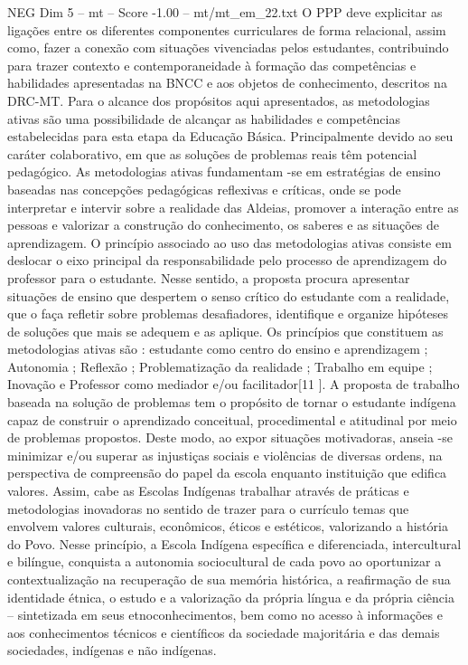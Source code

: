 \begin{textsample}{NEG Dim 5 – mt – Score -1.00 – mt/mt\_em\_22.txt}
O PPP deve explicitar as ligações entre os diferentes componentes curriculares de forma relacional, assim como, fazer a conexão com situações vivenciadas pelos estudantes, contribuindo para trazer contexto e contemporaneidade à formação das competências e habilidades apresentadas na BNCC e aos objetos de conhecimento, descritos na DRC-MT.
Para o alcance dos propósitos aqui apresentados, as metodologias ativas são uma possibilidade de alcançar as habilidades e competências estabelecidas para esta etapa da Educação Básica.
Principalmente devido ao seu caráter colaborativo, em que as soluções de problemas reais têm potencial pedagógico.
As metodologias ativas fundamentam -se em estratégias de ensino baseadas nas concepções pedagógicas reflexivas e críticas, onde se pode interpretar e intervir sobre a realidade das Aldeias, promover a interação entre as pessoas e valorizar a construção do conhecimento, os saberes e as situações de aprendizagem.
O princípio associado ao uso das metodologias ativas consiste em deslocar o eixo principal da responsabilidade pelo processo de aprendizagem do professor para o estudante.
Nesse sentido, a proposta procura apresentar situações de ensino que despertem o senso crítico do estudante com a realidade, que o faça refletir sobre problemas desafiadores, identifique e organize hipóteses de soluções que mais se adequem e as aplique.
Os princípios que constituem as metodologias ativas são : estudante como centro do ensino e aprendizagem ; Autonomia ; Reflexão ; Problematização da realidade ; Trabalho em equipe ; Inovação e Professor como mediador e/ou facilitador[11 ].
A proposta de trabalho baseada na solução de problemas tem o propósito de tornar o estudante indígena capaz de construir o aprendizado conceitual, procedimental e atitudinal por meio de problemas propostos.
Deste modo, ao expor situações motivadoras, anseia -se minimizar e/ou superar as injustiças sociais e violências de diversas ordens, na perspectiva de compreensão do papel da escola enquanto instituição que edifica valores.
Assim, cabe as Escolas Indígenas trabalhar através de práticas e metodologias inovadoras no sentido de trazer para o currículo temas que envolvem valores culturais, econômicos, éticos e estéticos, valorizando a história do Povo.
Nesse princípio, a Escola Indígena específica e diferenciada, intercultural e bilíngue, conquista a autonomia sociocultural de cada povo ao oportunizar a contextualização na recuperação de sua memória histórica, a reafirmação de sua identidade étnica, o estudo e a valorização da própria língua e da própria ciência – sintetizada em seus etnoconhecimentos, bem como no acesso à informações e aos conhecimentos técnicos e científicos da sociedade majoritária e das demais sociedades, indígenas e não indígenas.

\end{textsample}
